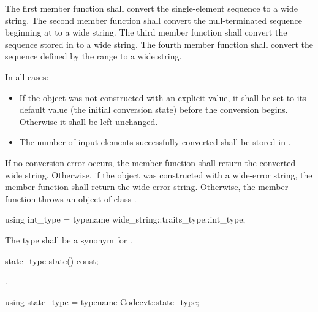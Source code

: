 \begin{itemdescr}
\pnum
\effects
The first member function shall convert the single-element sequence  to a
wide string. The second member function shall convert the null-terminated
sequence beginning at  to a wide string. The third member function
shall convert the sequence stored in  to a wide string. The fourth member
function shall convert the sequence defined by the range  to a
wide string.

\pnum
In all cases:
\begin{itemize}
\item If the  object was not constructed with an explicit value, it
shall be set to its default value (the initial conversion state) before the
conversion begins. Otherwise it shall be left unchanged.

\item The number of input elements successfully converted shall be stored in .
\end{itemize}

\pnum
\returns
If no conversion error occurs, the member function shall return the converted wide string.
Otherwise, if the object was constructed with a wide-error string, the
member function shall return the wide-error string.
Otherwise, the member function throws an object of class .
\end{itemdescr}

%
\begin{itemdecl}
using int_type = typename wide_string::traits_type::int_type;
\end{itemdecl}

\begin{itemdescr}
\pnum
The type shall be a synonym for .
\end{itemdescr}

%
\begin{itemdecl}
state_type state() const;
\end{itemdecl}

\begin{itemdescr}
\pnum
\returns
{}.
\end{itemdescr}

%
\begin{itemdecl}
using state_type = typename Codecvt::state_type;
\end{itemdecl}

